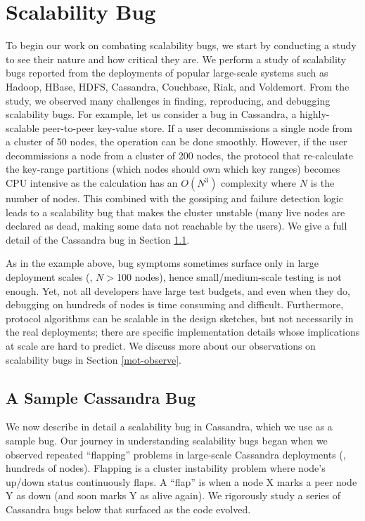\section{Scalability Bug}

To begin our work on combating scalability bugs, we start by conducting a study
to see their nature and how critical they are.
%
We perform a study of
\totAll scalability bugs reported from the deployments
of popular large-scale systems such as
Hadoop,
HBase,
HDFS,
Cassandra,
Couchbase,
Riak, and
Voldemort.
%
From the study, we observed many challenges in finding, reproducing, and
debugging scalability bugs. For example, let us consider a bug in Cassandra, a
highly-scalable peer-to-peer key-value store. If a user decommissions a single
node from a cluster of 50 nodes, the operation can be done smoothly. However, if
the user decommissions a node from a cluster of 200 nodes, the protocol that
re-calculate the key-range partitions (which nodes should own which key ranges)
becomes CPU intensive as the calculation has an $O(N^3)$ complexity where $N$ is
the number of nodes.  This combined with the gossiping and failure detection
logic leads to a scalability bug that makes the cluster unstable (many live
nodes are declared as dead, making some data not reachable by the users). We
give a full detail of the Cassandra bug in Section \ref{mot-bug}.

%
As in the example above, bug symptoms sometimes surface only in large deployment
scales (\eg, $N$$>$100 nodes), hence small/medium-scale testing is not enough.
Yet, not all developers have large test budgets, and even when they do,
debugging on hundreds of nodes is time consuming and difficult.
%
Furthermore, protocol algorithms can be scalable in the design sketches, but not
necessarily in the real deployments; there are specific implementation details
whose implications at scale are hard to predict. We discuss more about our
observations on scalability bugs in Section \ref{mot-observe}.

\subsection{A Sample Cassandra Bug}
\label{mot-bug}



We now describe in detail a scalability bug in Cassandra, which we use as a
sample bug.
%
Our journey in understanding scalability bugs began when we observed repeated
``flapping'' problems in large-scale Cassandra deployments (\ie, hundreds of
nodes).
%
Flapping is a cluster instability problem where node's up/down status
continuously flaps.  A ``flap'' is when a node X marks a peer node Y as down
(and soon marks Y as alive again).
%
We rigorously study a series of Cassandra bugs below that surfaced as the code
evolved.

